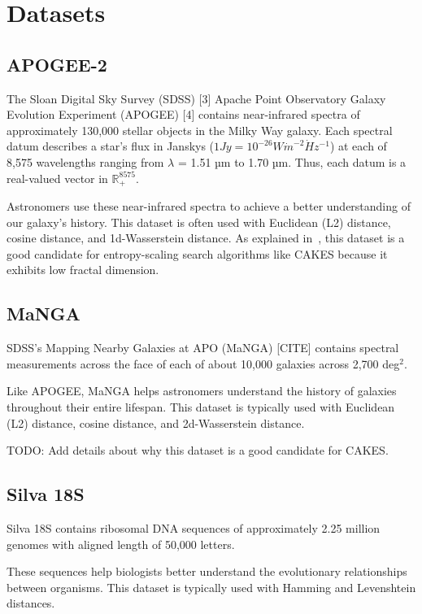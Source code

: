 
\section{Datasets}
\label{sec:datasets-and-distance-functions}

\subsection{APOGEE-2}
\label{subsec:datasets:apogee-2}
The Sloan Digital Sky Survey (SDSS) [3] Apache Point Observatory Galaxy Evolution
Experiment (APOGEE) [4] contains near-infrared
spectra of approximately 130,000 stellar objects in the Milky
Way galaxy. Each spectral datum describes a star's flux in
Janskys ($1 Jy = 10^{-26} W \dot m^{-2} \dot Hz^{-1}$) at each of 8,575 wavelengths ranging from $\lambda$ = 1.51 µm to 1.70 µm. 
Thus, each datum is a real-valued vector in $\mathbb{R}_{+}^{8575}$. 

Astronomers use these near-infrared spectra to achieve a better understanding of our galaxy's history. This dataset 
is often used with Euclidean (L2) distance, cosine distance, and 1d-Wasserstein distance. As explained in~\cite{ishaq2019clustered},
this dataset is a good candidate for entropy-scaling search algorithms like CAKES because it exhibits low fractal dimension. 

\subsection{MaNGA}
\label{subsec:datasets:manga}
SDSS's Mapping Nearby Galaxies at APO (MaNGA) [CITE] contains spectral measurements across the face of each of 
about 10,000 galaxies across 2,700 deg$^2$. 

Like APOGEE, MaNGA helps astronomers understand the history of galaxies throughout their entire lifespan. This 
dataset is typically used with Euclidean (L2) distance, cosine distance, and 2d-Wasserstein distance. 


TODO: Add details about why this dataset is a good candidate for CAKES. 

\subsection{Silva 18S}
\label{subsec:datasets:silva-18s}

Silva 18S contains ribosomal DNA sequences of approximately 2.25 
million genomes with aligned length of 50,000 letters. 


These sequences help biologists better understand the evolutionary relationships between organisms. 
This dataset is typically used with Hamming and Levenshtein distances. 


